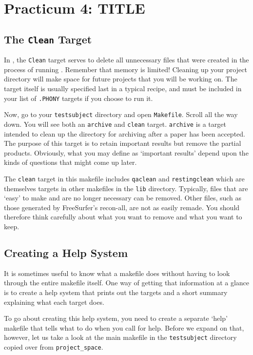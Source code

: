 \chapter*{Practicum 4: TITLE } %
\label{sec:practicum4}

\section{The \texttt{Clean} Target}
In \maken{}, the \texttt{Clean} target serves to delete all unnecessary files that were created in the process of running \maken{}. Remember that memory is limited! Cleaning up your project directory will make space for future projects that you will be working on. The target itself is usually specified last in a typical \maken{} recipe, and must be included in your list of \texttt{.PHONY} targets if you choose to run it. 

Now, go to your \texttt{testsubject} directory and open \texttt{Makefile}. Scroll all the way down. You will see both an \texttt{archive} and \texttt{clean} target. \texttt{archive} is a target intended to clean up the directory for archiving after a paper has been accepted. The purpose of this target is to retain important results but remove the partial products. Obviously, what you may define as `important results' depend upon the kinds of questions that might come up later. 


The \texttt{clean} target in this makefile includes \texttt{qaclean} and \texttt{restingclean} which are themselves targets in other makefiles in the \texttt{lib} directory. Typically, files that are `easy' to make and are no longer necessary can be removed. Other files, such as those generated by FreeSurfer's recon-all, are not as easily remade. You should therefore think carefully about what you want to remove and what you want to keep.  

\section{Creating a \maken{} Help System}
It is sometimes useful to know what a makefile does without having to look through the entire makefile itself. One way of getting that information at a glance is to create a \maken{} help system that prints out the targets and a short summary explaining what each target does. 

To go about creating this help system, you need to create a separate `help' makefile that tells \maken{} what to do when you call for help. Before we expand on that, however, let us take a look at the main makefile in the \texttt{testsubject} directory copied over from \texttt{project_space}.

